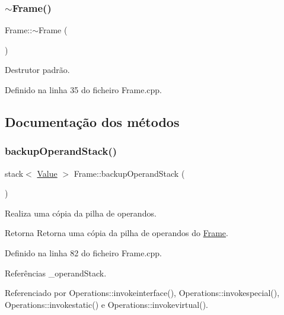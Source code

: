 \subsubsection{\texorpdfstring{$\sim$\+Frame()}{~Frame()}}
{\footnotesize\ttfamily Frame\+::$\sim$\+Frame (\begin{DoxyParamCaption}{ }\end{DoxyParamCaption})}



Destrutor padrão. 



Definido na linha 35 do ficheiro Frame.\+cpp.



\subsection{Documentação dos métodos}
\mbox{\label{classFrame_a874ac5162f805570d944a807ebf2bd40}} 
\subsubsection{\texorpdfstring{backup\+Operand\+Stack()}{backupOperandStack()}}
{\footnotesize\ttfamily stack$<$ \hyperlink{structValue}{Value} $>$ Frame\+::backup\+Operand\+Stack (\begin{DoxyParamCaption}{ }\end{DoxyParamCaption})}



Realiza uma cópia da pilha de operandos. 

\begin{DoxyReturn}{Retorna}
Retorna uma cópia da pilha de operandos do \hyperlink{classFrame}{Frame}. 
\end{DoxyReturn}


Definido na linha 82 do ficheiro Frame.\+cpp.



Referências \+\_\+operand\+Stack.



Referenciado por Operations\+::invokeinterface(), Operations\+::invokespecial(), Operations\+::invokestatic() e Operations\+::invokevirtual().

\mbox{\label{classFrame_a93c26ae659c3f1b11837a0e9942acb20}} 
